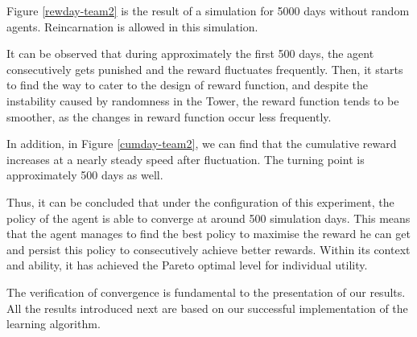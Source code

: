 Figure \ref{rewday-team2} is the result of a simulation for 5000 days without random agents. Reincarnation is allowed in this simulation. 

It can be observed that during approximately the first 500 days, the agent consecutively gets punished and the reward fluctuates frequently. Then, it starts to find the way to cater to the design of reward function, and despite the instability caused by randomness in the Tower, the reward function tends to be smoother, as the changes in reward function occur less frequently. 

In addition, in Figure \ref{cumday-team2}, we can find that the cumulative reward increases at a nearly steady speed after fluctuation. The turning point is approximately 500 days as well.

Thus, it can be concluded that under the configuration of this experiment, the policy of the agent is able to converge at around 500 simulation days. This means that the agent manages to find the best policy to maximise the reward he can get and persist this policy to consecutively achieve better rewards. Within its context and ability, it has achieved the Pareto optimal level for individual utility.

The verification of convergence is fundamental to the presentation of our results. All the results introduced next are based on our successful implementation of the learning algorithm.

